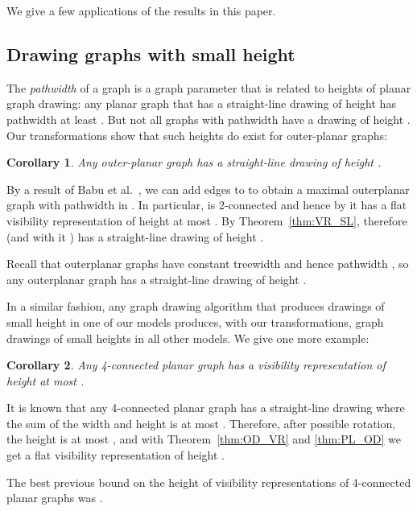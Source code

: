 \documentclass{elsarticle}
\newtheorem{corollary}{Corollary}
\newenvironment{proof}{{\bf Proof: }}{\hspace*{\fill}\medskip}
\begin{document}
We give a few applications of the results in this paper.

\subsection{Drawing graphs with small height}

The {\em pathwidth}  of a graph  is a graph
parameter that is related to heights of planar graph drawing:
any planar graph that has a straight-line drawing of height
 has pathwidth at least  \cite{FLW03}.  But not all graphs
with pathwidth  have a drawing of height .  Our transformations
show that such heights do exist for outer-planar graphs:

\begin{corollary}
Any outer-planar graph  has a straight-line drawing of height
.
\end{corollary}
\begin{proof}
By a result of Babu et al.~\cite{BBC+12}, we can add edges to 
to obtain a maximal outerplanar graph  with pathwidth in .
In particular,  is 2-connected and hence by 
\cite{Bie-WAOA12} it has a flat visibility representation of
height at most .  By Theorem~\ref{thm:VR_SL}, therefore
 (and with it ) has a straight-line drawing of height .
\end{proof}

Recall that outerplanar graphs have constant treewidth and hence
pathwidth , so any outerplanar graph has a straight-line
drawing of height .  

In a similar fashion, any graph drawing algorithm that produces
drawings of small height in one of our models produces, with our
transformations, graph drawings of small heights in all other models.
We give one more example:

\begin{corollary}
Any 4-connected planar graph has a visibility representation
of height at most .
\end{corollary}
\begin{proof}
It is known that any 4-connected planar graph has
a straight-line drawing 
where the sum of the width and height is at most  \cite{MNN06}.
Therefore, after possible rotation, the height is at most
,
and with 
Theorem~\ref{thm:OD_VR} and \ref{thm:PL_OD} 
we get a flat visibility representation of height .
\end{proof}

The best previous bound on the height of visibility representations
of 4-connected planar graphs was 
\cite{HWZ12}.
\end{document}

